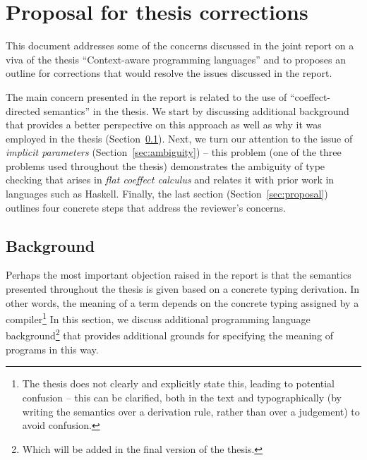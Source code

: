 \documentclass[
		twoside,openright,titlepage,numbers=noenddot,headinclude,%
                footinclude=true,cleardoublepage=empty,
                BCOR=10mm,paper=a4,fontsize=10pt, %
                ngerman,american, %
                ]{scrreprt}
\begin{document}
\frenchspacing %
\raggedbottom %
\pagestyle{plain} %



\chapter*{Proposal for thesis corrections}
\renewcommand*\thesection{\arabic{section}}

This document addresses some of the concerns discussed in the joint report on a viva of the thesis
``Context-aware programming languages'' and to proposes an outline for corrections that would
resolve the issues discussed in the report.

The main concern presented in the report is related to the use of ``coeffect-directed semantics''
in the thesis. We start by discussing additional background that provides a better perspective on
this approach as well as why it was employed in the thesis (Section~\ref{sec:background}). Next,
we turn our attention to the issue of \emph{implicit parameters} (Section~\ref{sec:ambiguity}) --
this problem (one of the three problems used throughout the thesis) demonstrates the ambiguity
of type checking that arises in \emph{flat coeffect calculus} and relates it with prior work in
languages such as Haskell. Finally, the last section (Section~\ref{sec:proposal}) outlines four
concrete steps that address the reviewer's concerns.

\section{Background}
\label{sec:background}

Perhaps the most important objection raised in the report is that the semantics presented throughout
the thesis is given based on a concrete typing derivation. In other words, the meaning of a term
depends on the concrete typing assigned by a compiler\footnote{The thesis does not clearly and
explicitly state this, leading to potential confusion -- this can be clarified, both in the
text and typographically (by writing the semantics over a derivation rule, rather than over
a judgement) to avoid confusion.} In this section, we discuss additional programming language
background\footnote{Which will be added in the final version of the thesis.} that provides
additional grounds for specifying the meaning of programs in this way.
\end{document}
